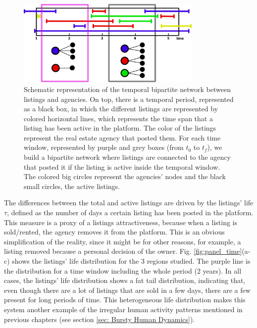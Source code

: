 \begin{figure}
    \vspace{0.2 cm}
    \centering
    \includegraphics[width = 0.8\textwidth]{Figs/Idealista_dynamics/temporal_bipartite.pdf}
	\caption[Housing market as a temporal bipartite network.]{Schematic representation of the temporal bipartite network between listings and agencies. On top, there is a temporal period, represented as a black box, in which the different listings are represented by colored horizontal lines, which represents the time span that a listing has been active in the platform. The color of the listings represent the real estate agency that posted them. For each time window, represented by purple and grey boxes (from $t_0$ to $t_f$), we build a bipartite network where listings are connected to the agency that posted it if the listing is active inside the temporal window. The colored big circles represent the agencies' nodes and the black small circles, the active listings. \label{fig:temporal_bipartite}}
\end{figure}

The differences between the total and active listings are driven by the listings' life $\tau$, defined as the number of days a certain listing has been posted in the platform. This measure is a proxy of a listings attractiveness, because when a listing is sold/rented, the agency removes it from the platform. This is an obvious simplification of the reality, since it might be for other reasons, for example, a listing removed because a personal decision of the owner. Fig. \ref{fig:panel_time}(a-c) shows the listings' life distribution for the 3 regions studied. The purple line is the distribution for a time window including the whole period (2 years). In all cases, the listings' life distribution shows a fat tail distribution, indicating that, even though there are a lot of listings that are sold in a few days, there are a few present for long periods of time. This heterogeneous life distribution makes this system another example of the irregular human activity patterns mentioned in previous chapters (see section \ref{sec: Bursty Human Dynamics}).

